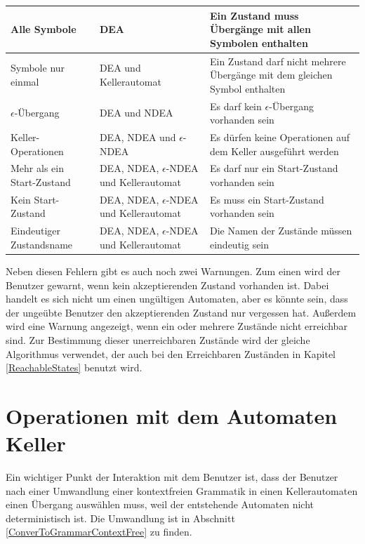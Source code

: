 \noindent
\begin{tabular}{|p{2.1cm}|p{2.7cm}|p{6.0cm}|}
  \hline
  Alle Symbole &
  DEA &
  Ein Zustand muss Übergänge mit allen Symbolen enthalten \\
  \hline
  Symbole nur einmal &
  DEA und Kellerautomat &
  Ein Zustand darf nicht mehrere Übergänge mit dem gleichen Symbol enthalten \\
  \hline
  $\epsilon$-Übergang &
  DEA und NDEA &
  Es darf kein $\epsilon$-Übergang vorhanden sein \\
  \hline
  Keller-Operationen &
  DEA, NDEA und $\epsilon$-NDEA &
  Es dürfen keine Operationen auf dem Keller ausgeführt werden \\
  \hline
  Mehr als ein Start-Zustand &
  DEA, NDEA, $\epsilon$-NDEA und Kellerautomat&
  Es darf nur ein Start-Zustand vorhanden sein \\
  \hline
  Kein Start-Zustand &
  DEA, NDEA, $\epsilon$-NDEA und Kellerautomat&
  Es muss ein Start-Zustand vorhanden sein \\
  \hline
  Eindeutiger Zustandsname &
  DEA, NDEA, $\epsilon$-NDEA und Kellerautomat&
  Die Namen der Zustände müssen eindeutig sein \\
  \hline
\end{tabular}
\vspace{10pt}

\noindent
Neben diesen Fehlern gibt es auch noch zwei Warnungen. Zum einen wird der
Benutzer gewarnt, wenn kein akzeptierenden Zustand vorhanden ist. Dabei handelt
es sich nicht um einen ungültigen Automaten, aber es könnte sein, dass der
ungeübte Benutzer den akzeptierenden Zustand nur vergessen hat. Außerdem wird
eine Warnung angezeigt, wenn ein oder mehrere Zustände nicht erreichbar sind.
Zur Bestimmung dieser unerreichbaren Zustände wird der gleiche Algorithmus
verwendet, der auch bei den Erreichbaren Zuständen in Kapitel
\ref{ReachableStates} benutzt wird.


\section{Operationen mit dem Automaten Keller}

Ein wichtiger Punkt der Interaktion mit dem Benutzer ist, dass der Benutzer
nach einer Umwandlung einer kontextfreien Grammatik in einen Kellerautomaten
einen Übergang auswählen muss, weil der entstehende Automaten nicht
deterministisch ist. Die Umwandlung ist in Abschnitt
\ref{ConverToGrammarContextFree} zu finden.\vspace{10pt}

